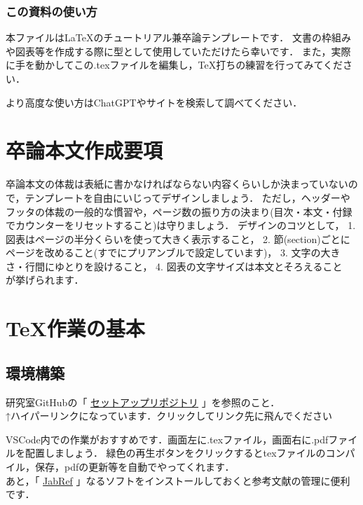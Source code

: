 \documentclass[11pt,a4j,onecolumn]{jsreport} %
\begin{document}
\subsubsection{この資料の使い方}

本ファイルは\LaTeX のチュートリアル兼卒論テンプレートです．
文書の枠組みや図表等を作成する際に型として使用していただけたら幸いです．
また，実際に手を動かしてこの.texファイルを編集し，\TeX 打ちの練習を行ってみてください．

より高度な使い方はChatGPTやサイトを検索して調べてください．


\section{卒論本文作成要項}

卒論本文の体裁は表紙に書かなければならない内容くらいしか決まっていないので，テンプレートを自由にいじってデザインしましょう．
ただし，ヘッダーやフッタの体裁の一般的な慣習や，ページ数の振り方の決まり(目次・本文・付録でカウンターをリセットすること)は守りましょう．
デザインのコツとして，
1. 図表はページの半分くらいを使って大きく表示すること，
2. 節(section)ごとにページを改めること(すでにプリアンブルで設定しています)，
3. 文字の大きさ・行間にゆとりを設けること，
4. 図表の文字サイズは本文とそろえること~
が挙げられます．

\section{TeX作業の基本}

\subsection{環境構築}

研究室GitHubの「
\href{https://github.com/ItoiLab/Itoilab-setup-guide/blob/main/Itoilab-setup-guide.md#latex%E3%81%AE%E5%B0%8E%E5%85%A5}{セットアップリポジトリ}
\cite{itoilab2025}」を参照のこと．\\
\hspace{10em}↑ハイパーリンクになっています．クリックしてリンク先に飛んでください

VSCode内での作業がおすすめです．画面左に.texファイル，画面右に.pdfファイルを配置しましょう．
緑色の再生ボタンをクリックするとtexファイルのコンパイル，保存，pdfの更新等を自動でやってくれます．\\

あと，「
\href{https://www.jabref.org/}{JabRef}
」なるソフトをインストールしておくと参考文献の管理に便利です．
\end{document}

